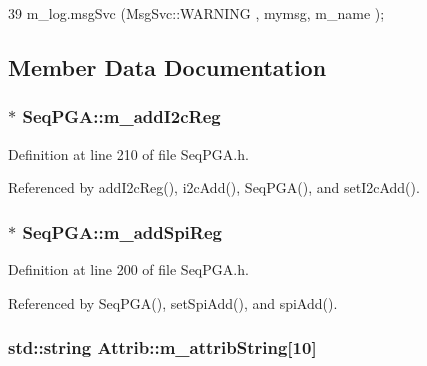 \begin{DoxyCode}
39 { m_log.msgSvc (MsgSvc::WARNING , mymsg, m_name ); }
\end{DoxyCode}


\subsection{Member Data Documentation}
\hypertarget{classSeqPGA_ac3a6aad3fec65ceb78528b6d20deeb3f}{
\subsubsection[{m\_\-addI2cReg}]{$\ast$ {\bf SeqPGA::m\_\-addI2cReg}}}
\label{classSeqPGA_ac3a6aad3fec65ceb78528b6d20deeb3f}


Definition at line 210 of file SeqPGA.h.

Referenced by addI2cReg(), i2cAdd(), SeqPGA(), and setI2cAdd().\hypertarget{classSeqPGA_af31d87ad56c501584ccb9c60776a1289}{
\subsubsection[{m\_\-addSpiReg}]{$\ast$ {\bf SeqPGA::m\_\-addSpiReg}}}
\label{classSeqPGA_af31d87ad56c501584ccb9c60776a1289}


Definition at line 200 of file SeqPGA.h.

Referenced by SeqPGA(), setSpiAdd(), and spiAdd().\hypertarget{classAttrib_a3414521d7a82476e874b25a5407b5e63}{
\subsubsection[{m\_\-attribString}]{\setlength{\rightskip}{0pt plus 5cm}std::string {\bf Attrib::m\_\-attribString}\mbox{[}10\mbox{]}}}
\label{classAttrib_a3414521d7a82476e874b25a5407b5e63}


